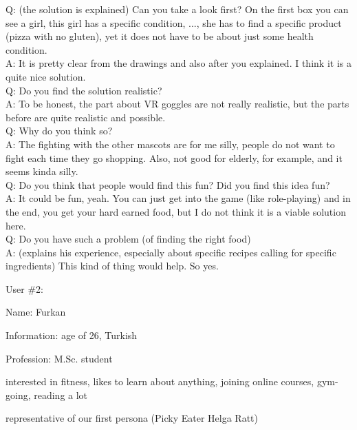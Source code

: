 \documentclass[a4paper,10pt,oneside]{scrreprt}
\begin{document}
\noindent Q: (the solution is explained) Can you take a look first? On the first box you can see a girl, this girl has a specific condition, ..., she has to find a specific product (pizza with no gluten), yet it does not have to be about just some health condition.  \\
A: It is pretty clear from the drawings and also after you explained. I think it is a quite nice solution.\\
Q: Do you find the solution realistic?\\
A: To be honest, the part about VR goggles are not really realistic, but the parts before are quite realistic and possible. \\
Q: Why do you think so?\\
A: The fighting with the other mascots are for me silly, people do not want to fight each time they go shopping. Also, not good for elderly, for example, and it seems kinda silly.\\
Q: Do you think that people would find this fun? Did you find this idea fun?\\
A: It could be fun, yeah. You can just get into the game (like role-playing) and in the end, you get your hard earned food, but I do not think it is a viable solution here.\\
Q: Do you have such a problem (of finding the right food)\\
A: (explains his experience, especially about specific recipes calling for specific ingredients) This kind of thing would help. So yes.


\bigskip
\bigskip

User \#2:
\begin{compactitem}
	\item Name: Furkan
	\item Information: age of 26, Turkish
	\item Profession: M.Sc. student
	\item interested in fitness, likes to learn about anything, joining online courses, gym-going, reading a lot
	\item representative of our first persona (Picky Eater Helga Ratt)
\end{compactitem}
\bigskip
\end{document}

